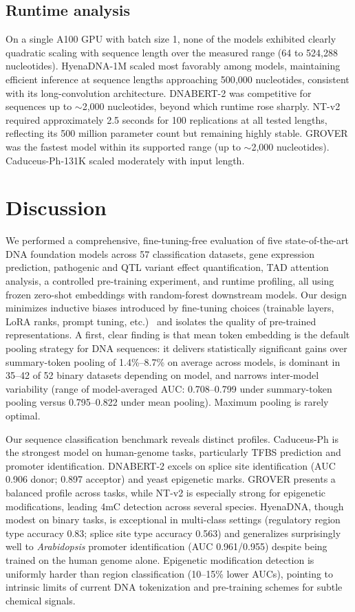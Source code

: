 \documentclass[11pt,a4paper]{article}
\begin{document}
\subsection{Runtime analysis}
On a single A100 GPU with batch size 1, none of the models exhibited clearly quadratic scaling with sequence length over the measured range (64 to 524{,}288 nucleotides). HyenaDNA-1M scaled most favorably among models, maintaining efficient inference at sequence lengths approaching 500{,}000 nucleotides, consistent with its long-convolution architecture. DNABERT-2 was competitive for sequences up to $\sim$2{,}000 nucleotides, beyond which runtime rose sharply. NT-v2 required approximately 2.5 seconds for 100 replications at all tested lengths, reflecting its 500 million parameter count but remaining highly stable. GROVER was the fastest model within its supported range (up to $\sim$2{,}000 nucleotides). Caduceus-Ph-131K scaled moderately with input length.

\section{Discussion}
We performed a comprehensive, fine-tuning-free evaluation of five state-of-the-art DNA foundation models across 57 classification datasets, gene expression prediction, pathogenic and QTL variant effect quantification, TAD attention analysis, a controlled pre-training experiment, and runtime profiling, all using frozen zero-shot embeddings with random-forest downstream models. Our design minimizes inductive biases introduced by fine-tuning choices (trainable layers, LoRA ranks, prompt tuning, etc.)~\citep{hu2022lora, liu2022ptuning, lester2021prompt} and isolates the quality of pre-trained representations. A first, clear finding is that mean token embedding is the default pooling strategy for DNA sequences: it delivers statistically significant gains over summary-token pooling of 1.4\%--8.7\% on average across models, is dominant in 35--42 of 52 binary datasets depending on model, and narrows inter-model variability (range of model-averaged AUC: 0.708--0.799 under summary-token pooling versus 0.795--0.822 under mean pooling). Maximum pooling is rarely optimal.

Our sequence classification benchmark reveals distinct profiles. Caduceus-Ph is the strongest model on human-genome tasks, particularly TFBS prediction and promoter identification. DNABERT-2 excels on splice site identification (AUC 0.906 donor; 0.897 acceptor) and yeast epigenetic marks. GROVER presents a balanced profile across tasks, while NT-v2 is especially strong for epigenetic modifications, leading 4mC detection across several species. HyenaDNA, though modest on binary tasks, is exceptional in multi-class settings (regulatory region type accuracy 0.83; splice site type accuracy 0.563) and generalizes surprisingly well to \emph{Arabidopsis} promoter identification (AUC 0.961/0.955) despite being trained on the human genome alone. Epigenetic modification detection is uniformly harder than region classification (10--15\% lower AUCs), pointing to intrinsic limits of current DNA tokenization and pre-training schemes for subtle chemical signals.
\end{document}
